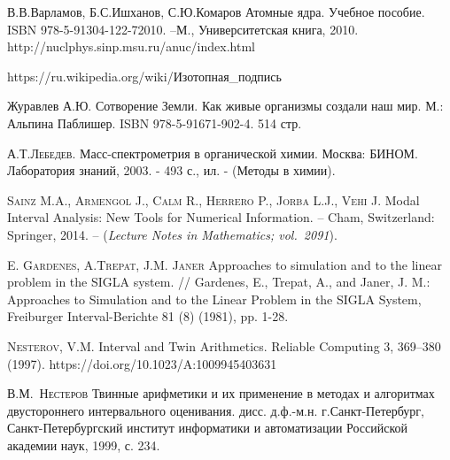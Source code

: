\documentclass[a5paper,openany]{book}
\begin{document}
\begin{thebibliography}{00}
В.В.Варламов, Б.С.Ишханов, С.Ю.Комаров Атомные ядра. Учебное пособие. ISBN 978-5-91304-122-72010. –М., Университетская книга, 2010.
http://nuclphys.sinp.msu.ru/anuc/index.html

https://ru.wikipedia.org/wiki/Изотопная\_подпись

 Журавлев А.Ю. Сотворение Земли. Как живые организмы создали наш мир.
М.: Альпина Паблишер. ISBN 978-5-91671-902-4. 514 стр.





\textsc{А.Т.Лебедев.} Масс-спектрометрия в органической химии. Москва: БИНОМ. Лаборатория знаний, 2003. - 493 с., ил. - (Методы в химии).




\textsc{Sainz M.A., Armengol J., Calm R., Herrero P., Jorba L.J., Vehi J.}
Modal Interval Analysis: New Tools for Numerical Information. -- Cham, Switzerland: 
Springer, 2014. -- (\textsl{Lecture Notes in Mathematics; vol.~2091}). 


\textsc{E. Gardenes, A.Trepat, J.M. Janer}
Approaches to simulation and to the linear problem in the SIGLA system. //
Gardenes, E., Trepat, A., and Janer, J. M.: Approaches to Simulation and to the Linear Problem in the SIGLA System, Freiburger Interval-Berichte 81 (8) (1981), pp. 1-28.


\textsc{Nesterov, V.M.} Interval and Twin Arithmetics. Reliable Computing 3, 369–380 (1997). https://doi.org/10.1023/A:1009945403631

\textsc{В.М.~Нестеров} Твинные арифметики и их применение в методах и алгоритмах двустороннего интервального оценивания. дисс. д.ф.-м.н. г.Санкт-Петербург, Санкт-Петербургский институт информатики и автоматизации Российской академии наук, 1999, с. 234.



	
\end{thebibliography} 







\raggedright\small\printindex   

\end{document}
